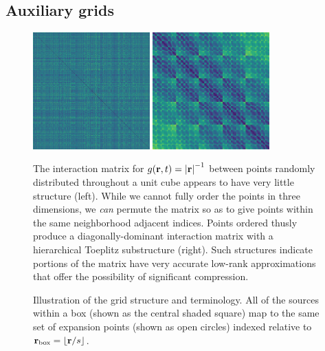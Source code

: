 \subsection{Auxiliary grids}

\begin{figure}
  \centering
  \includegraphics[width=0.4\textwidth]{figures/dist_mat_unsorted}
  \hspace{1cm}
  \includegraphics[width=0.4\textwidth]{figures/dist_mat_sorted}
  \caption{\label{fig:matrix structure} The interaction matrix for $g(\vb{r}, t) = \abs{\vb{r}}^{-1}$ between points randomly distributed throughout a unit cube appears to have very little structure (left).
    While we cannot fully order the points in three dimensions, we \emph{can} permute the matrix so as to give points within the same neighborhood adjacent indices.
    Points ordered thusly produce a diagonally-dominant interaction matrix with a hierarchical Toeplitz substructure (right).
    Such structures indicate portions of the matrix have very accurate low-rank approximations that offer the possibility of significant compression.
  }
\end{figure}

\begin{figure}
  \centering
  
  \caption{\label{fig:aim terminology} Illustration of the grid structure and terminology.
    All of the sources within a box (shown as the central shaded square) map to the same set of expansion points (shown as open circles) indexed relative to $\vb{r}_\text{box} = \lfloor\vb{r}/s\rfloor$.
  }
\end{figure}

